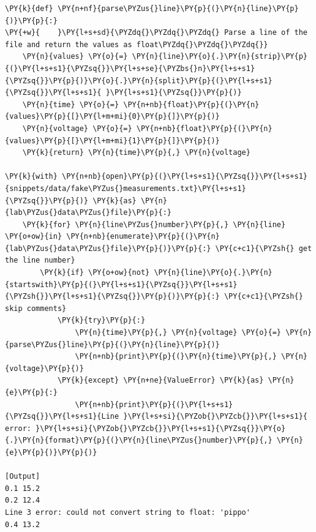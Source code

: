 \begin{Verbatim}[label=\makebox{\url{https://github.com/lucabaldini/cmepda/tree/master/slides/latex/snippets/when\_to\_catch\_2.py}},commandchars=\\\{\}]
\PY{k}{def} \PY{n+nf}{parse\PYZus{}line}\PY{p}{(}\PY{n}{line}\PY{p}{)}\PY{p}{:}
\PY{+w}{    }\PY{l+s+sd}{\PYZdq{}\PYZdq{}\PYZdq{} Parse a line of the file and return the values as float\PYZdq{}\PYZdq{}\PYZdq{}}
    \PY{n}{values} \PY{o}{=} \PY{n}{line}\PY{o}{.}\PY{n}{strip}\PY{p}{(}\PY{l+s+s1}{\PYZsq{}}\PY{l+s+se}{\PYZbs{}n}\PY{l+s+s1}{\PYZsq{}}\PY{p}{)}\PY{o}{.}\PY{n}{split}\PY{p}{(}\PY{l+s+s1}{\PYZsq{}}\PY{l+s+s1}{ }\PY{l+s+s1}{\PYZsq{}}\PY{p}{)}
    \PY{n}{time} \PY{o}{=} \PY{n+nb}{float}\PY{p}{(}\PY{n}{values}\PY{p}{[}\PY{l+m+mi}{0}\PY{p}{]}\PY{p}{)}
    \PY{n}{voltage} \PY{o}{=} \PY{n+nb}{float}\PY{p}{(}\PY{n}{values}\PY{p}{[}\PY{l+m+mi}{1}\PY{p}{]}\PY{p}{)}
    \PY{k}{return} \PY{n}{time}\PY{p}{,} \PY{n}{voltage}

\PY{k}{with} \PY{n+nb}{open}\PY{p}{(}\PY{l+s+s1}{\PYZsq{}}\PY{l+s+s1}{snippets/data/fake\PYZus{}measurements.txt}\PY{l+s+s1}{\PYZsq{}}\PY{p}{)} \PY{k}{as} \PY{n}{lab\PYZus{}data\PYZus{}file}\PY{p}{:}
    \PY{k}{for} \PY{n}{line\PYZus{}number}\PY{p}{,} \PY{n}{line} \PY{o+ow}{in} \PY{n+nb}{enumerate}\PY{p}{(}\PY{n}{lab\PYZus{}data\PYZus{}file}\PY{p}{)}\PY{p}{:} \PY{c+c1}{\PYZsh{} get the line number}
        \PY{k}{if} \PY{o+ow}{not} \PY{n}{line}\PY{o}{.}\PY{n}{startswith}\PY{p}{(}\PY{l+s+s1}{\PYZsq{}}\PY{l+s+s1}{\PYZsh{}}\PY{l+s+s1}{\PYZsq{}}\PY{p}{)}\PY{p}{:} \PY{c+c1}{\PYZsh{} skip comments}
            \PY{k}{try}\PY{p}{:}
                \PY{n}{time}\PY{p}{,} \PY{n}{voltage} \PY{o}{=} \PY{n}{parse\PYZus{}line}\PY{p}{(}\PY{n}{line}\PY{p}{)}
                \PY{n+nb}{print}\PY{p}{(}\PY{n}{time}\PY{p}{,} \PY{n}{voltage}\PY{p}{)}
            \PY{k}{except} \PY{n+ne}{ValueError} \PY{k}{as} \PY{n}{e}\PY{p}{:}
                \PY{n+nb}{print}\PY{p}{(}\PY{l+s+s1}{\PYZsq{}}\PY{l+s+s1}{Line }\PY{l+s+si}{\PYZob{}\PYZcb{}}\PY{l+s+s1}{ error: }\PY{l+s+si}{\PYZob{}\PYZcb{}}\PY{l+s+s1}{\PYZsq{}}\PY{o}{.}\PY{n}{format}\PY{p}{(}\PY{n}{line\PYZus{}number}\PY{p}{,} \PY{n}{e}\PY{p}{)}\PY{p}{)}

[Output]
0.1 15.2
0.2 12.4
Line 3 error: could not convert string to float: 'pippo'
0.4 13.2
\end{Verbatim}